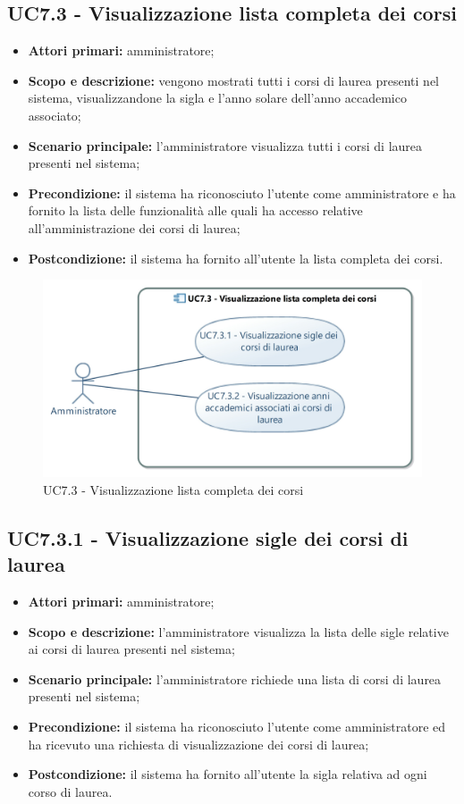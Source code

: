 \documentclass[AnalisiDeiRequisiti.tex]{subfiles}
\begin{document}

\subsection{UC7.3 - Visualizzazione lista completa dei corsi}
\begin{itemize}
	\item \textbf{Attori primari:} amministratore;
	\item \textbf{Scopo e descrizione:} vengono mostrati tutti i corsi di laurea presenti nel sistema, visualizzandone la sigla e l'anno solare dell'anno accademico associato;
	\item \textbf{Scenario principale:} l'amministratore visualizza tutti i corsi di laurea presenti nel sistema;
	\item \textbf{Precondizione:} il sistema ha riconosciuto l'utente come amministratore e ha fornito la lista delle funzionalità alle quali ha accesso relative all'amministrazione dei corsi di laurea; 
	\item \textbf{Postcondizione:} il sistema ha fornito all'utente la lista completa dei corsi.
\end{itemize}
\begin{figure}[H]
	\centering
	\includegraphics[width=0.8\linewidth]{UC7_3.jpg}
	\caption{UC7.3 - Visualizzazione lista completa dei corsi}
	\label{fig:UC7.3 - Visualizzazione lista completa dei corsi}
\end{figure}
\subsection{UC7.3.1 - Visualizzazione sigle dei corsi di laurea}
\begin{itemize}
	\item \textbf{Attori primari:} amministratore;
	\item \textbf{Scopo e descrizione:} l'amministratore visualizza la lista delle sigle relative ai corsi di laurea presenti nel sistema;
	\item \textbf{Scenario principale:} l'amministratore richiede una lista di corsi di laurea presenti nel sistema;
	\item \textbf{Precondizione:} il sistema ha riconosciuto l'utente come amministratore ed ha ricevuto una richiesta di visualizzazione dei corsi di laurea; 
	\item \textbf{Postcondizione:} il sistema ha fornito all'utente la sigla relativa ad ogni corso di laurea.
\end{itemize}
\end{document}
